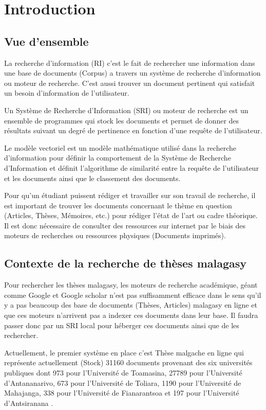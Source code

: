 \chapter{Introduction}

\section{Vue d'ensemble}
La recherche d'information (RI) c'est le fait de rechercher une information dans une base de documents (Corpus) a travers un système de recherche d'information ou moteur de recherche. C'est aussi trouver un document pertinent qui satisfait un besoin d'information de l'utilisateur.

Un Système de Recherche d'Information (SRI) ou moteur de recherche est un ensemble de programmes qui stock les documents et permet de donner des résultats suivant un degré de pertinence en fonction d'une requête de l'utilisateur.

Le modèle vectoriel est un modèle mathématique utilisé dans la recherche d'information pour définir la comportement de la Système de Recherche d'Information et définit l'algorithme de similarité entre la requête de l'utilisateur et les documents ainsi que le classement des documents.

Pour qu'un étudiant puissent rédiger et travailler sur son travail de recherche, il est important de trouver les documents concernant le thème en question (Articles, Thèses, Mémoires, etc.) pour rédiger l'état de l'art ou cadre théorique. Il est donc nécessaire de consulter des ressources sur internet par le biais des moteurs de recherches ou ressources physiques (Documents imprimés).

\section{Contexte de la recherche de thèses malagasy}
Pour rechercher les thèses malagasy, les moteurs de recherche académique, géant comme Google et Google scholar n'est pas suffisamment efficace dans le sens qu'il y a pas beaucoup des base de documents (Thèses, Articles) malagasy en ligne et que ces moteurs n'arrivent pas a indexer ces documents dans leur base. Il faudra passer donc par un SRI local pour héberger ces documents ainsi que de les rechercher.

Actuellement, le premier système en place c'est \og Thèse malgache en ligne \fg{} qui représente actuellement (Stock) 31160 documents provenant des six universités publiques dont 973 pour l'Université de Toamasina, 27789 pour l'Université d'Antananarivo, 673 pour l'Université de Toliara, 1190 pour l'Université de Mahajanga, 338 pour l'Université de Fianarantsoa et 197 pour l'Université d'Antsiranana \citep{these-malgache-en-ligne}.

